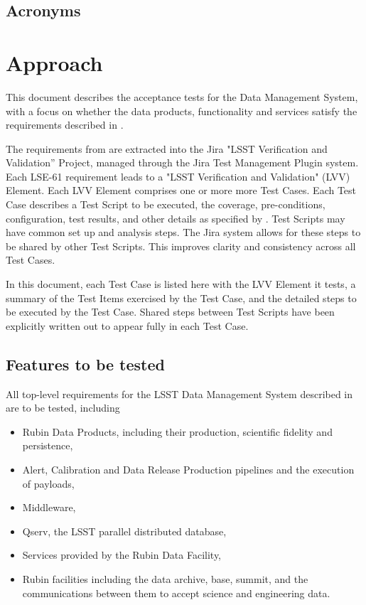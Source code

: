 \documentclass[DM,STS,toc]{lsstdoc}
\begin{document}
\subsection{Acronyms \label{sect:acronyms}} %



\section{Approach}
\label{sec:approach}

This document describes the acceptance tests for the  Data Management System,
with a focus on whether the data products, functionality and services satisfy the requirements described in .

The requirements from  are extracted into the Jira "LSST Verification and Validation'' Project, managed through the Jira Test Management Plugin system.  
Each LSE-61 requirement leads to a "LSST Verification and Validation" (LVV) Element.  
Each LVV Element comprises one or more more Test Cases.  
Each Test Case describes a Test Script to be executed, the coverage, pre-conditions, configuration, test results, and other details as specified by . 
Test Scripts may have common set up and analysis steps. 
The Jira system allows for these steps to be shared by other Test Scripts.  This improves clarity and consistency across all Test Cases.

In this document, each Test Case is listed here with the LVV Element it tests, a summary of the Test Items exercised by the Test Case, and the detailed steps to be executed by the Test Case.  
Shared steps between Test Scripts have been explicitly written out to appear fully in each Test Case.

\subsection{Features to be tested}
\label{sec:feat2test}

All top-level requirements for the LSST Data Management System described in  are to be tested, including
\begin{itemize}
\item Rubin Data Products, including their production, scientific fidelity and persistence, 
\item Alert, Calibration and Data Release Production pipelines and the execution of payloads, 
\item Middleware,
\item Qserv, the LSST parallel distributed database,
\item Services provided by the Rubin Data Facility,
\item Rubin facilities including the data archive, base, summit, and the communications between them to accept science and engineering data.
\end{itemize}
\end{document}
